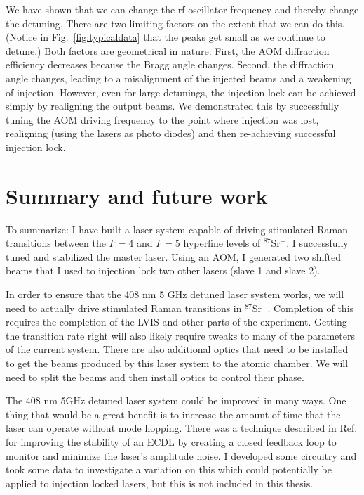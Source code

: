 We have shown that we can change the rf oscillator frequency and thereby change the detuning. There are two limiting factors on the extent that we can do this. (Notice in Fig.\ \ref{fig:typicaldata} that the peaks get small as we continue to detune.) Both factors are geometrical in nature: First, the AOM diffraction efficiency decreases because the Bragg angle changes. Second, the diffraction angle changes, leading to a misalignment of the injected beams and a weakening of injection. However, even for large detunings, the injection lock can be achieved simply by realigning the output beams. We demonstrated this by successfully tuning the AOM driving frequency to the point where injection was lost, realigning (using the lasers as photo diodes) and then re-achieving successful injection lock.

\section{Summary and future work}
To summarize: I have built a laser system capable of driving stimulated Raman transitions between the $F=4$ and $F=5$ hyperfine levels of $^{87}$Sr$^+$. I successfully tuned and stabilized the master laser. Using an AOM, I generated two shifted beams that I used to injection lock two other lasers (slave 1 and slave 2).

In order to ensure that the 408 nm 5 GHz detuned laser system works, we will need to actually drive stimulated Raman transitions in $^{87}$Sr$^+$. Completion of this requires the completion of the LVIS and other parts of the experiment. Getting the transition rate right will also likely require tweaks to many of the parameters of the current system. There are also additional optics that need to be installed to get the beams produced by this laser system to the atomic chamber. We will need to split the beams and then install optics to control their phase. 

The 408 nm 5GHz detuned laser system could be improved in many ways. One thing that would be a great benefit is to increase the amount of time that the laser can operate without mode hopping. There was a technique described in Ref.\,\cite{chiowChuLock} for improving the stability of an ECDL by creating a closed feedback loop to monitor and minimize the laser's amplitude noise. I developed some circuitry and took some data to investigate a variation on this which could potentially be applied to injection locked lasers, but this is not included in this thesis. 



